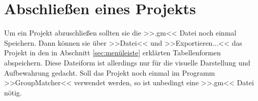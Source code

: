 \chapter{Abschließen eines Projekts}
\label{ch:abschliessen_eines_projekts}

Um ein Projekt abzuschließen sollten sie die >>.gm<< Datei noch einmal Speichern. Dann können sie über >>Datei<< und >>Exportieren...<< das Projekt in den in Abschnitt \ref{sec:menüleiste} erklärten Tabellenformen abspeichern. Diese Dateiform ist allerdings nur für die visuelle Darstellung und Aufbewahrung gedacht. Soll das Projekt noch einmal im Programm >>GroupMatcher<< verwendet werden, so ist unbedingt eine >>.gm<< Datei nötig.
